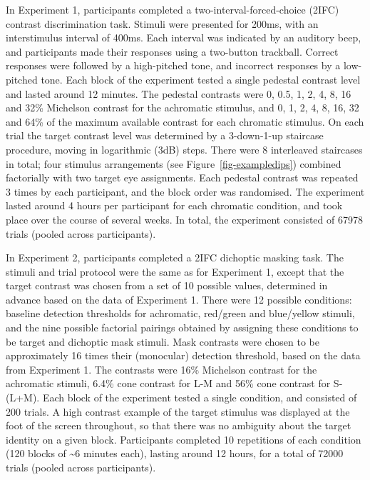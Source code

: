 \documentclass[
  letterpaper,
  DIV=11,
  numbers=noendperiod]{scrartcl}
\begin{document}
In Experiment 1, participants completed a two-interval-forced-choice
(2IFC) contrast discrimination task. Stimuli were presented for 200ms,
with an interstimulus interval of 400ms. Each interval was indicated by
an auditory beep, and participants made their responses using a
two-button trackball. Correct responses were followed by a high-pitched
tone, and incorrect responses by a low-pitched tone. Each block of the
experiment tested a single pedestal contrast level and lasted around 12
minutes. The pedestal contrasts were 0, 0.5, 1, 2, 4, 8, 16 and 32\%
Michelson contrast for the achromatic stimulus, and 0, 1, 2, 4, 8, 16,
32 and 64\% of the maximum available contrast for each chromatic
stimulus. On each trial the target contrast level was determined by a
3-down-1-up staircase procedure, moving in logarithmic (3dB) steps.
There were 8 interleaved staircases in total; four stimulus arrangements
(see Figure~\ref{fig-exampledips}) combined factorially with two target
eye assignments. Each pedestal contrast was repeated 3 times by each
participant, and the block order was randomised. The experiment lasted
around 4 hours per participant for each chromatic condition, and took
place over the course of several weeks. In total, the experiment
consisted of 67978 trials (pooled across participants).

In Experiment 2, participants completed a 2IFC dichoptic masking task.
The stimuli and trial protocol were the same as for Experiment 1, except
that the target contrast was chosen from a set of 10 possible values,
determined in advance based on the data of Experiment 1. There were 12
possible conditions: baseline detection thresholds for achromatic,
red/green and blue/yellow stimuli, and the nine possible factorial
pairings obtained by assigning these conditions to be target and
dichoptic mask stimuli. Mask contrasts were chosen to be approximately
16 times their (monocular) detection threshold, based on the data from
Experiment 1. The contrasts were 16\% Michelson contrast for the
achromatic stimuli, 6.4\% cone contrast for L-M and 56\% cone contrast
for S-(L+M). Each block of the experiment tested a single condition, and
consisted of 200 trials. A high contrast example of the target stimulus
was displayed at the foot of the screen throughout, so that there was no
ambiguity about the target identity on a given block. Participants
completed 10 repetitions of each condition (120 blocks of
\textasciitilde6 minutes each), lasting around 12 hours, for a total of
72000 trials (pooled across participants).
\end{document}
